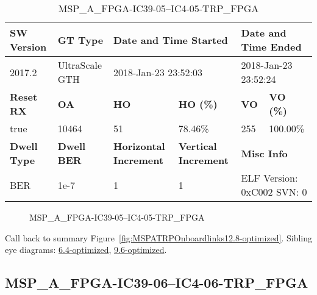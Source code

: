 \begin{table}[h]
\centering
\caption{MSP\_A\_FPGA-IC39-05--IC4-05-TRP\_FPGA}
\label{tab:MSPAFPGAIC3905IC405TRPFPGA12.8-optimized}
\begin{tabular}{@{}|l|l|l|l|l|l|@{}}
\toprule
\textbf{SW Version}                & \textbf{GT Type}   & \multicolumn{2}{l|}{\textbf{Date and Time Started}}            & \multicolumn{2}{l|}{\textbf{Date and Time Ended}}        \\ \midrule
2017.2                       & UltraScale GTH          & \multicolumn{2}{l|}{2018-Jan-23 23:52:03}                   & \multicolumn{2}{l|}{2018-Jan-23 23:52:24}               \\ \midrule
\textbf{Reset RX}                  & \textbf{OA} & \textbf{HO}   & \textbf{HO (\%)} & \textbf{VO} & \textbf{VO (\%)} \\ \midrule
true & 10464        & 51          & 78.46\%        & 255        & 100.00\%       \\ \midrule
\textbf{Dwell Type}                & \textbf{Dwell BER} & \textbf{Horizontal Increment} & \textbf{Vertical Increment}    & \multicolumn{2}{l|}{\textbf{Misc Info}}                  \\ \midrule
BER                            & 1e-7        & 1        & 1           & \multicolumn{2}{l|}{ELF Version: 0xC002 SVN: 0}                         \\ \bottomrule
\end{tabular}
\end{table}

\begin{figure}[h]
\caption{MSP\_A\_FPGA-IC39-05--IC4-05-TRP\_FPGA} \label{fig:MSPAFPGAIC3905IC405TRPFPGA12.8-optimized}
\end{figure}

Call back to summary Figure~\ref{fig:MSPATRPOnboardlinks12.8-optimized}.
Sibling eye diagrams: \hyperref[sec:MSPAFPGAIC3905IC405TRPFPGA6.4-optimized]{6.4-optimized}, \hyperref[sec:MSPAFPGAIC3905IC405TRPFPGA9.6-optimized]{9.6-optimized}.

\clearpage
\newpage


\subsection{MSP\_A\_FPGA-IC39-06--IC4-06-TRP\_FPGA}\label{sec:MSPAFPGAIC3906IC406TRPFPGA12.8-optimized}

